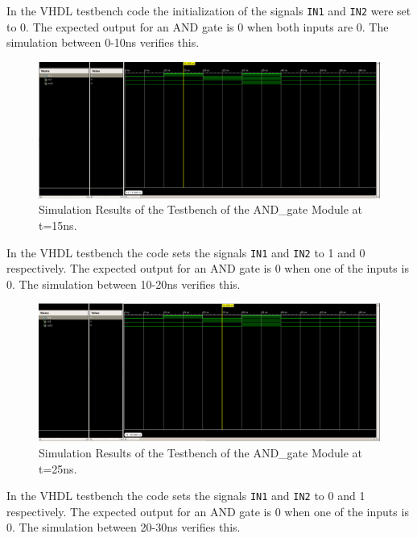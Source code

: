 \documentclass{article}
\begin{document}
In the VHDL testbench code the initialization of the signals \verb|IN1| and \verb|IN2| were set to 0. The expected output for an AND gate is 0 when both inputs are 0. The simulation between 0-10ns verifies this.



\begin{figure}[H]
    \centering
    \includegraphics[width=\textwidth]{simat15ns.png}
    \caption{Simulation Results of the Testbench of the AND\_gate Module at t=15ns.}
    \label{fig:simulation15}
\end{figure}

In the VHDL testbench the code sets the signals \verb|IN1| and \verb|IN2| to 1 and 0 respectively. The expected output for an AND gate is 0 when one of the inputs is 0. The simulation between 10-20ns verifies this.

\begin{figure}[H]
    \centering
    \includegraphics[width=\textwidth]{simat25ns.png}
    \caption{Simulation Results of the Testbench of the AND\_gate Module at t=25ns.}
    \label{fig:sim25}

\end{figure}

In the VHDL testbench the code sets the signals \verb|IN1| and \verb|IN2| to 0 and 1 respectively. The expected output for an AND gate is 0 when one of the inputs is 0. The simulation between 20-30ns verifies this.
\end{document}
